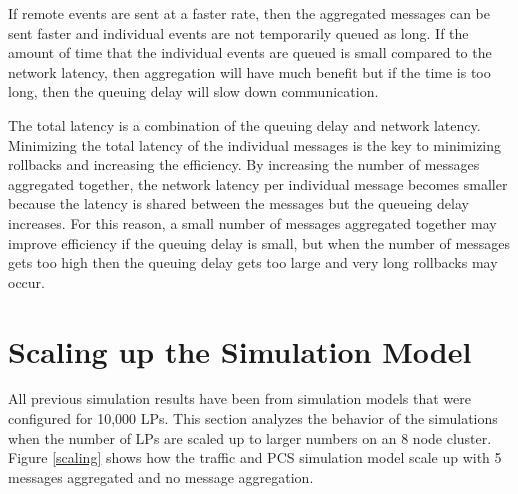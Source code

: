\documentclass[11pt]{book}
\begin{document}
If remote events are sent at a faster rate, then the aggregated messages can be sent faster and
individual events are not temporarily queued as long.  If the amount of time that the individual
events are queued is small compared to the network latency, then aggregation will have much benefit
but if the time is too long, then the queuing delay will slow down communication.

The total latency is a combination of the queuing delay and network latency.  Minimizing the total
latency of the individual messages is the key to minimizing rollbacks and increasing the efficiency.
By increasing the number of messages aggregated together, the network latency per individual message
becomes smaller because the latency is shared between the messages but the queueing delay increases.
For this reason, a small number of messages aggregated together may improve efficiency if the
queuing delay is small, but when the number of messages gets too high then the queuing delay gets
too large and very long rollbacks may occur.

\section{Scaling up the Simulation Model}

All previous simulation results have been from simulation models that were configured for 10,000
LPs.  This section analyzes the behavior of the simulations when the number of LPs are scaled up to
larger numbers on an 8 node cluster.  Figure \ref{scaling} shows how the traffic and PCS simulation
model scale up with 5 messages aggregated and no message aggregation.
\end{document}
